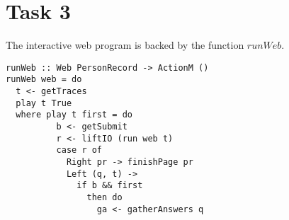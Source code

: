 \documentclass[10pt]{article}
\begin{document}
\section*{Task 3}
The interactive web program is backed by the function $runWeb$.
\begin{lstlisting}
runWeb :: Web PersonRecord -> ActionM ()                                                                                                                                                      
runWeb web = do                                                                                                                                                                               
  t <- getTraces                                                                                                                                                                              
  play t True                                                                                                                                                                                 
  where play t first = do                                                                                                                                                                     
          b <- getSubmit                                                                                                                                                                      
          r <- liftIO (run web t)                                                                                                                                                             
          case r of                                                                                                                                                                           
            Right pr -> finishPage pr                                                                                                                                                         
            Left (q, t) ->                                                                                                                                                                    
              if b && first                                                                                                                                                                   
                then do                                                                                                                                                                       
                  ga <- gatherAnswers q                                                                                                                                                       

\end{lstlisting}
\end{document}
